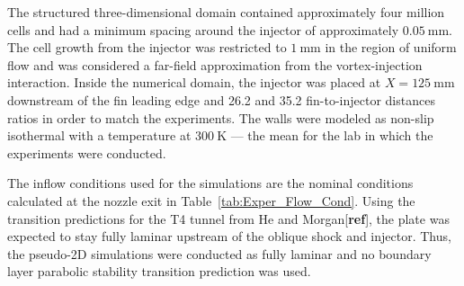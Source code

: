 \documentclass{AIAA}
\begin{document}
The structured three-dimensional domain contained approximately four million cells and had a minimum spacing around the injector of approximately $\SI{0.05}{\milli\meter}$.
The cell growth from the injector was restricted to $\SI{1}{\milli\meter}$ in the region of uniform flow and was considered a far-field approximation from the vortex-injection interaction.
Inside the numerical domain, the injector was placed at $X=\SI{125}{\milli\meter}$ downstream of the fin leading edge and 26.2 and 35.2 fin-to-injector distances ratios in order to match the experiments.
The walls were modeled as non-slip isothermal with a temperature at $\SI{300}{\kelvin}$ --- the mean for the lab in which the experiments were conducted. 


The inflow conditions used for the simulations are the nominal conditions calculated at the nozzle exit in Table~\ref{tab:Exper_Flow_Cond}.
Using the transition predictions for the T4 tunnel from He and Morgan[\textbf{ref}], the plate was expected to stay fully laminar upstream of the oblique shock and injector.
Thus, the pseudo-2D simulations were conducted as fully laminar and no boundary layer parabolic stability transition prediction was used.
\end{document}
